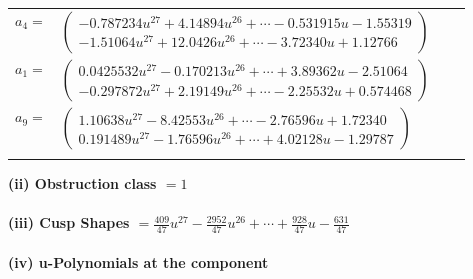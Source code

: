\documentclass[1p]{elsarticle_modified}
\theoremstyle{definition}
\begin{document}
\begin{tabular}{m{7pt} m{180pt} m{7pt} m{180pt} }
\flushright $a_{4}=$&$\begin{pmatrix}-0.787234 u^{27}+4.14894 u^{26}+\cdots-0.531915 u-1.55319\\-1.51064 u^{27}+12.0426 u^{26}+\cdots-3.72340 u+1.12766\end{pmatrix}$ \\
\flushright $a_{1}=$&$\begin{pmatrix}0.0425532 u^{27}-0.170213 u^{26}+\cdots+3.89362 u-2.51064\\-0.297872 u^{27}+2.19149 u^{26}+\cdots-2.25532 u+0.574468\end{pmatrix}$ \\
\flushright $a_{9}=$&$\begin{pmatrix}1.10638 u^{27}-8.42553 u^{26}+\cdots-2.76596 u+1.72340\\0.191489 u^{27}-1.76596 u^{26}+\cdots+4.02128 u-1.29787\end{pmatrix}$\\&\end{tabular}
\flushleft \textbf{(ii) Obstruction class $= 1$}\\~\\
\flushleft \textbf{(iii) Cusp Shapes $= \frac{409}{47} u^{27}-\frac{2952}{47} u^{26}+\cdots+\frac{928}{47} u-\frac{631}{47}$}\\~\\
\newpage\renewcommand{\arraystretch}{1}
\flushleft \textbf{(iv) u-Polynomials at the component}\newline \\
\end{document}
